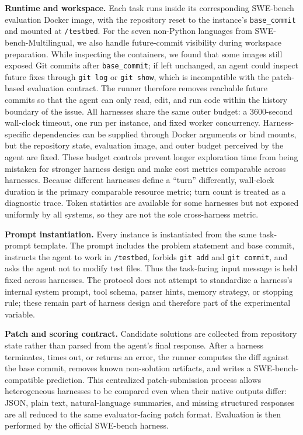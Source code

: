 \textbf{Runtime and workspace.}
Each task runs inside its corresponding SWE-bench evaluation Docker image, with the repository reset to the instance's \texttt{base\_commit} and mounted at \texttt{/testbed}. For the seven non-Python languages from SWE-bench-Multilingual, we also handle future-commit visibility during workspace preparation. While inspecting the containers, we found that some images still exposed Git commits after \texttt{base\_commit}; if left unchanged, an agent could inspect future fixes through \texttt{git log} or \texttt{git show}, which is incompatible with the patch-based evaluation contract. The runner therefore removes reachable future commits so that the agent can only read, edit, and run code within the history boundary of the issue. All harnesses share the same outer budget: a 3600-second wall-clock timeout, one run per instance, and fixed worker concurrency. Harness-specific dependencies can be supplied through Docker arguments or bind mounts, but the repository state, evaluation image, and outer budget perceived by the agent are fixed. These budget controls prevent longer exploration time from being mistaken for stronger harness design and make cost metrics comparable across harnesses. Because different harnesses define a ``turn'' differently, wall-clock duration is the primary comparable resource metric; turn count is treated as a diagnostic trace. Token statistics are available for some harnesses but not exposed uniformly by all systems, so they are not the sole cross-harness metric.

\textbf{Prompt instantiation.}
Every instance is instantiated from the same task-prompt template. The prompt includes the problem statement and base commit, instructs the agent to work in \texttt{/testbed}, forbids \texttt{git add} and \texttt{git commit}, and asks the agent not to modify test files. Thus the task-facing input message is held fixed across harnesses. The protocol does not attempt to standardize a harness's internal system prompt, tool schema, parser hints, memory strategy, or stopping rule; these remain part of harness design and therefore part of the experimental variable.

\textbf{Patch and scoring contract.}
Candidate solutions are collected from repository state rather than parsed from the agent's final response. After a harness terminates, times out, or returns an error, the runner computes the diff against the base commit, removes known non-solution artifacts, and writes a SWE-bench-compatible prediction. This centralized patch-submission process allows heterogeneous harnesses to be compared even when their native outputs differ: JSON, plain text, natural-language summaries, and missing structured responses are all reduced to the same evaluator-facing patch format. Evaluation is then performed by the official SWE-bench harness.

